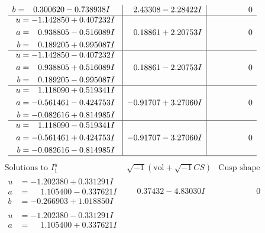 \documentclass[1p]{elsarticle_modified}
\theoremstyle{definition}
\newcommand{\I}{\sqrt{-1}}
\begin{document}
$$\begin{array}{c|c|c}
\begin{aligned}
b &= \phantom{-}0.300620 - 0.738938 I\end{aligned}
 & \phantom{-}2.43308 - 2.28422 I & \phantom{-0.000000 } 0 \\ \hline\begin{aligned}
u &= -1.142850 + 0.407232 I \\
a &= \phantom{-}0.938805 - 0.516089 I \\
b &= \phantom{-}0.189205 + 0.995087 I\end{aligned}
 & \phantom{-}0.18861 + 2.20753 I & \phantom{-0.000000 } 0 \\ \hline\begin{aligned}
u &= -1.142850 - 0.407232 I \\
a &= \phantom{-}0.938805 + 0.516089 I \\
b &= \phantom{-}0.189205 - 0.995087 I\end{aligned}
 & \phantom{-}0.18861 - 2.20753 I & \phantom{-0.000000 } 0 \\ \hline\begin{aligned}
u &= \phantom{-}1.118090 + 0.519341 I \\
a &= -0.561461 - 0.424753 I \\
b &= -0.082616 + 0.814985 I\end{aligned}
 & -0.91707 + 3.27060 I & \phantom{-0.000000 } 0 \\ \hline\begin{aligned}
u &= \phantom{-}1.118090 - 0.519341 I \\
a &= -0.561461 + 0.424753 I \\
b &= -0.082616 - 0.814985 I\end{aligned}
 & -0.91707 - 3.27060 I & \phantom{-0.000000 } 0\\
 \hline 
 \end{array}$$\newpage$$\begin{array}{c|c|c}  
\text{Solutions to }I^u_{1}& \I (\text{vol} + \sqrt{-1}CS) & \text{Cusp shape}\\
 \hline 
\begin{aligned}
u &= -1.202380 + 0.331291 I \\
a &= \phantom{-}1.105400 - 0.337621 I \\
b &= -0.266903 + 1.018850 I\end{aligned}
 & \phantom{-}0.37432 - 4.83030 I & \phantom{-0.000000 } 0 \\ \hline\begin{aligned}
u &= -1.202380 - 0.331291 I \\
a &= \phantom{-}1.105400 + 0.337621 I \\

\end{aligned}
\end{array}$$
\end{document}
